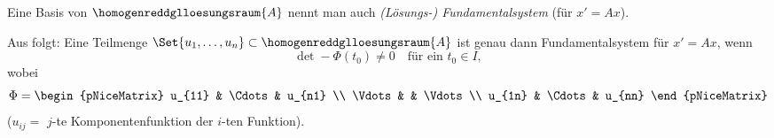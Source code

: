 \begin{definition*}
  Eine Basis von \( \homogenreddglloesungsraum{A} \) nennt man auch \emph{(Lösungs-) Fundamentalsystem} (für \( x'=Ax \)).
\end{definition*}
\begin{bemerkung*}
  Aus  folgt: Eine Teilmenge \( \Set{u_1,\dotsc,u_n}\subset \homogenreddglloesungsraum{A} \) ist genau dann Fundamentalsystem für \( x'=Ax \), wenn
  \begin{equation*}
    \det-{\Phi}(t_0)\neq 0\quad \text{für ein }t_0\in I,
  \end{equation*}
  wobei
  \begin{equation*}
    \Phi=\begin{pNiceMatrix} u_{11} & \Cdots & u_{n1} \\ \Vdots &  & \Vdots \\ u_{1n} & \Cdots & u_{nn} \end{pNiceMatrix}
  \end{equation*}
  (\( u_{ij}= \) \( j \)-te Komponentenfunktion der \( i \)-ten Funktion).
\end{bemerkung*}
